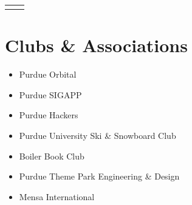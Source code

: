 \documentclass[
	10pt, %
]{FreemanCV}
\begin{document}
\begin{paracol}{2}


\begin{supertabular}{r l} %






\end{supertabular}


\section{Clubs \& Associations}

\begin{itemize}
	\item Purdue Orbital
	\item Purdue SIGAPP
	\item Purdue Hackers
	\item Purdue University Ski \& Snowboard Club
	\item Boiler Book Club
	\item Purdue Theme Park Engineering \& Design
	\item Mensa International
\end{itemize}



\end{paracol}
\end{document}
